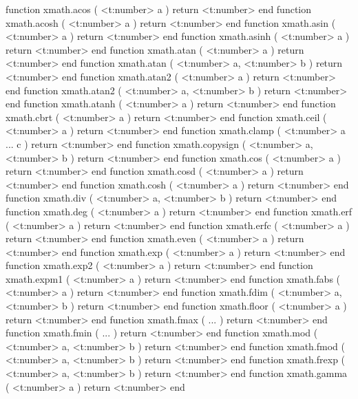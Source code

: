 \starttyping[option=LUA]
function xmath.acos       ( <t:number> a )               return <t:number> end
function xmath.acosh      ( <t:number> a )               return <t:number> end
function xmath.asin       ( <t:number> a )               return <t:number> end
function xmath.asinh      ( <t:number> a )               return <t:number> end
function xmath.atan       ( <t:number> a )               return <t:number> end
function xmath.atan       ( <t:number> a, <t:number> b ) return <t:number> end
function xmath.atan2      ( <t:number> a )               return <t:number> end
function xmath.atan2      ( <t:number> a, <t:number> b ) return <t:number> end
function xmath.atanh      ( <t:number> a )               return <t:number> end
function xmath.cbrt       ( <t:number> a )               return <t:number> end
function xmath.ceil       ( <t:number> a )               return <t:number> end
function xmath.clamp      ( <t:number> a ... c         ) return <t:number> end
function xmath.copysign   ( <t:number> a, <t:number> b ) return <t:number> end
function xmath.cos        ( <t:number> a )               return <t:number> end
function xmath.cosd       ( <t:number> a )               return <t:number> end
function xmath.cosh       ( <t:number> a )               return <t:number> end
function xmath.div        ( <t:number> a, <t:number> b ) return <t:number> end
function xmath.deg        ( <t:number> a )               return <t:number> end
function xmath.erf        ( <t:number> a )               return <t:number> end
function xmath.erfc       ( <t:number> a )               return <t:number> end
function xmath.even       ( <t:number> a )               return <t:number> end
function xmath.exp        ( <t:number> a )               return <t:number> end
function xmath.exp2       ( <t:number> a )               return <t:number> end
function xmath.expm1      ( <t:number> a )               return <t:number> end
function xmath.fabs       ( <t:number> a )               return <t:number> end
function xmath.fdim       ( <t:number> a, <t:number> b ) return <t:number> end
function xmath.floor      ( <t:number> a )               return <t:number> end
function xmath.fmax       ( ... )                        return <t:number> end
function xmath.fmin       ( ... )                        return <t:number> end
function xmath.mod        ( <t:number> a, <t:number> b ) return <t:number> end
function xmath.fmod       ( <t:number> a, <t:number> b ) return <t:number> end
function xmath.frexp      ( <t:number> a, <t:number> b ) return <t:number> end
function xmath.gamma      ( <t:number> a )               return <t:number> end
